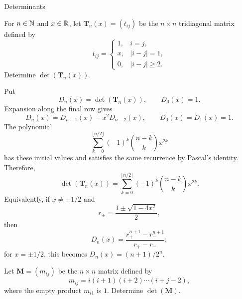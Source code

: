 \begin{expectedproblemgroup}{Determinants}
        \begin{expectedsubproblem}
            For $n\in\mathbb{N}$ and $x\in\mathbb{R}$, let
            $\mathbf{T}_n(x)=(t_{ij})$ be the $n\times n$ tridiagonal matrix
            defined by
            \[
                t_{ij}
                =
                \begin{cases}
                    1, & i=j,\\
                    x, & |i-j|=1,\\
                    0, & |i-j|\geq2.
                \end{cases}
            \]
            Determine $\det(\mathbf{T}_n(x))$.
        \end{expectedsubproblem}

        \begin{expectedsubsolution}
            Put
            \[
                D_n(x)=\det(\mathbf{T}_n(x)),
                \qquad
                D_0(x)=1.
            \]
            Expansion along the final row gives
            \[
                D_n(x)=D_{n-1}(x)-x^2D_{n-2}(x),
                \qquad
                D_0(x)=D_1(x)=1.
            \]
            The polynomial
            \[
                \sum_{k=0}^{\lfloor n/2\rfloor}
                (-1)^k\binom{n-k}{k}x^{2k}
            \]
            has these initial values and satisfies the same recurrence by
            Pascal's identity. Therefore,
            \[
                \boxed{
                    \det(\mathbf{T}_n(x))
                    =
                    \sum_{k=0}^{\lfloor n/2\rfloor}
                    (-1)^k\binom{n-k}{k}x^{2k}
                }.
            \]
            Equivalently, if $x\neq\pm1/2$ and
            \[
                r_{\pm}=\frac{1\pm\sqrt{1-4x^2}}{2},
            \]
            then
            \[
                D_n(x)=\frac{r_+^{n+1}-r_-^{n+1}}{r_+-r_-};
            \]
            for $x=\pm1/2$, this becomes $D_n(x)=(n+1)/2^n$.
        \end{expectedsubsolution}

        \begin{expectedsubproblem}
            Let $\mathbf{M}=(m_{ij})$ be the $n\times n$ matrix defined by
            \[
                m_{ij}=i(i+1)(i+2)\cdots(i+j-2),
            \]
            where the empty product $m_{i1}$ is $1$. Determine
            $\det(\mathbf{M})$.
        \end{expectedsubproblem}


\end{expectedproblemgroup}

